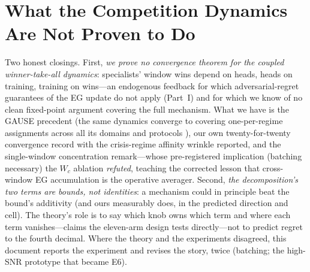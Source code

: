 \section{What the Competition Dynamics Are Not Proven to Do}
\label{sec:dd4-honesty}

Two honest closings. First, \emph{we prove no convergence theorem for
the coupled winner-take-all dynamics}: specialists' window wins depend on
heads, heads on training, training on wins---an endogenous feedback for
which adversarial-regret guarantees of the EG update do not apply (Part~I)
and for which we know of no clean fixed-point argument covering the full
mechanism. What we have is the GAUSE precedent (the same dynamics
converge to covering one-per-regime assignments across all its domains
and protocols \cite{li2026gause}), our own twenty-for-twenty convergence
record with the crisis-regime affinity wrinkle reported, and the
single-window concentration remark---whose pre-registered implication
(batching necessary) the $W_c$ ablation \emph{refuted}, teaching the
corrected lesson that cross-window EG accumulation is the operative
averager. Second, \emph{the decomposition's two terms are bounds, not
identities}: a mechanism could in principle beat the bound's additivity
(and ours measurably does, in the predicted direction and cell). The
theory's role is to say which knob owns which term and where each term
vanishes---claims the eleven-arm design tests directly---not to predict
regret to the fourth decimal. Where the theory and the experiments
disagreed, this document reports the experiment and revises the story,
twice (batching; the high-SNR prototype that became E6).
